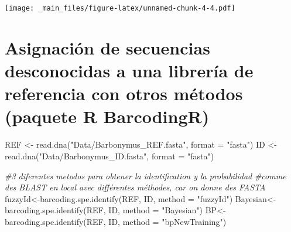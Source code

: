 \documentclass[
]{book}
\newenvironment{Shaded}{\begin{snugshade}}{\end{snugshade}}
\newcommand{\AttributeTok}[1]{\textcolor[rgb]{0.77,0.63,0.00}{#1}}
\newcommand{\CommentTok}[1]{\textcolor[rgb]{0.56,0.35,0.01}{\textit{#1}}}
\newcommand{\FunctionTok}[1]{\textcolor[rgb]{0.00,0.00,0.00}{#1}}
\newcommand{\NormalTok}[1]{#1}
\newcommand{\OtherTok}[1]{\textcolor[rgb]{0.56,0.35,0.01}{#1}}
\newcommand{\StringTok}[1]{\textcolor[rgb]{0.31,0.60,0.02}{#1}}
\begin{document}
\texttt{[image: \_main\_files/figure-latex/unnamed-chunk-4-4.pdf]}

\hypertarget{asignaciuxf3n-de-secuencias-desconocidas-a-una-libreruxeda-de-referencia-con-otros-muxe9todos-paquete-r-barcodingr}{%
\section*{Asignación de secuencias desconocidas a una librería de referencia con otros métodos (paquete R BarcodingR)}\label{asignaciuxf3n-de-secuencias-desconocidas-a-una-libreruxeda-de-referencia-con-otros-muxe9todos-paquete-r-barcodingr}}

\begin{Shaded}
\begin{Highlighting}[]
\NormalTok{REF }\OtherTok{\textless{}{-}} \FunctionTok{read.dna}\NormalTok{(}\StringTok{"Data/Barbonymus\_REF.fasta"}\NormalTok{, }\AttributeTok{format =} \StringTok{"fasta"}\NormalTok{)}
\NormalTok{ID }\OtherTok{\textless{}{-}} \FunctionTok{read.dna}\NormalTok{(}\StringTok{"Data/Barbonymus\_ID.fasta"}\NormalTok{, }\AttributeTok{format =} \StringTok{"fasta"}\NormalTok{)}

\CommentTok{\#3 diferentes metodos para obtener la identification y la probabilidad}
\CommentTok{\#comme des BLAST en local avec différentes méthodes, car on donne des FASTA}
\NormalTok{fuzzyId}\OtherTok{\textless{}{-}}\FunctionTok{barcoding.spe.identify}\NormalTok{(REF, ID, }\AttributeTok{method =} \StringTok{"fuzzyId"}\NormalTok{)}
\NormalTok{Bayesian}\OtherTok{\textless{}{-}}\FunctionTok{barcoding.spe.identify}\NormalTok{(REF, ID, }\AttributeTok{method =} \StringTok{"Bayesian"}\NormalTok{)}
\NormalTok{BP}\OtherTok{\textless{}{-}}\FunctionTok{barcoding.spe.identify}\NormalTok{(REF, ID, }\AttributeTok{method =} \StringTok{"bpNewTraining"}\NormalTok{)}
\end{Highlighting}
\end{Shaded}
\end{document}
